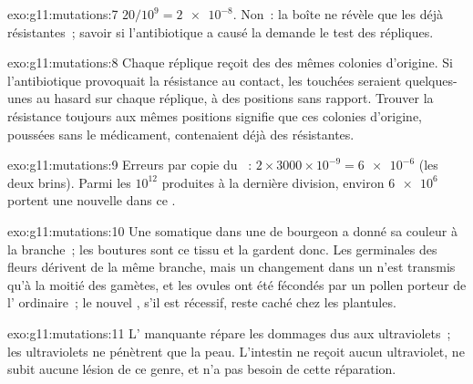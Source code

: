 \begin{solution}{exo:g11:mutations:7}
$20/10^9 = \num{2e-8}$. Non~: la boîte ne révèle que les  déjà
résistantes~; savoir si l'antibiotique a causé la  demande le
test des répliques.
\end{solution}

\begin{solution}{exo:g11:mutations:8}
Chaque réplique reçoit des  des mêmes colonies d'origine. Si
l'antibiotique provoquait la résistance au contact, les 
touchées seraient quelques-unes au hasard sur chaque réplique, à des
positions sans rapport. Trouver la résistance toujours aux mêmes
positions signifie que ces colonies d'origine, poussées sans le
médicament, contenaient déjà des  résistantes.
\end{solution}

\begin{solution}{exo:g11:mutations:9}
Erreurs par copie du ~: $2 \times 3000 \times 10^{-9} =
\num{6e-6}$ (les deux brins). Parmi les $10^{12}$  produites à
la dernière division, environ $\num{6e6}$ portent une  nouvelle
dans ce .
\end{solution}

\begin{solution}{exo:g11:mutations:10}
Une  somatique dans une  de bourgeon a donné sa couleur
à la branche~; les boutures sont ce tissu et la gardent donc. Les
 germinales des fleurs dérivent de la même branche, mais un
changement dans un  n'est transmis qu'à la moitié des gamètes, et
les ovules ont été fécondés par un pollen porteur de l'
ordinaire~; le nouvel , s'il est récessif, reste caché chez les
plantules.
\end{solution}

\begin{solution}{exo:g11:mutations:11}
L' manquante répare les dommages dus aux ultraviolets~; les
ultraviolets ne pénètrent que la peau. L'intestin ne reçoit aucun
ultraviolet, ne subit aucune lésion de ce genre, et n'a pas besoin de
cette réparation.
\end{solution}

